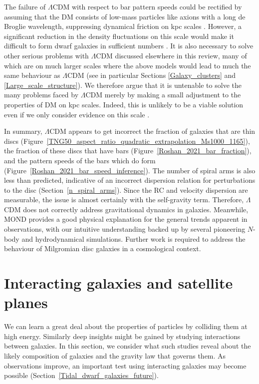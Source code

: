 \documentclass[fleqn,usenatbib,useAMS]{mnras} %
\begin{document}
The failure of $\Lambda$CDM with respect to bar pattern speeds could be rectified by assuming that the DM consists of low-mass particles like axions with a long de Broglie wavelength, suppressing dynamical friction on kpc scales \citep[for a review, see][]{Lee_2018_review}. However, a significant reduction in the density fluctuations on this scale would make it difficult to form dwarf galaxies in sufficient numbers \citep[see section~6 of][]{Roshan_2021_bar_speed}. It is also necessary to solve other serious problems with $\Lambda$CDM discussed elsewhere in this review, many of which are on much larger scales where the above models would lead to much the same behaviour as $\Lambda$CDM (see in particular Sections \ref{Galaxy_clusters} and \ref{Large_scale_structure}). We therefore argue that it is untenable to solve the many problems faced by $\Lambda$CDM merely by making a small adjustment to the properties of DM on kpc scales. Indeed, this is unlikely to be a viable solution even if we only consider evidence on this scale \citep{Rogers_2021}.

In summary, $\Lambda$CDM appears to get incorrect the fraction of galaxies that are thin discs (Figure~\ref{TNG50_aspect_ratio_quadratic_extrapolation_Ms1000_1165}), the fraction of these discs that have bars (Figure~\ref{Roshan_2021_bar_fraction}), and the pattern speeds of the bars which do form (Figure~\ref{Roshan_2021_bar_speed_inference}). The number of spiral arms is also less than predicted, indicative of an incorrect dispersion relation for perturbations to the disc (Section~\ref{n_spiral_arms}). Since the RC and velocity dispersion are measurable, the issue is almost certainly with the self-gravity term. Therefore, $\Lambda$CDM does not correctly address gravitational dynamics in galaxies. Meanwhile, MOND provides a good physical explanation for the general trends apparent in observations, with our intuitive understanding backed up by several pioneering $N$-body and hydrodynamical simulations. Further work is required to address the behaviour of Milgromian disc galaxies in a cosmological context.





\section{Interacting galaxies and satellite planes}
\label{Interacting_galaxies}

We can learn a great deal about the properties of particles by colliding them at high energy. Similarly deep insights might be gained by studying interactions between galaxies. In this section, we consider what such studies reveal about the likely composition of galaxies and the gravity law that governs them. As observations improve, an important test using interacting galaxies may become possible (Section~\ref{Tidal_dwarf_galaxies_future}).
\end{document}
